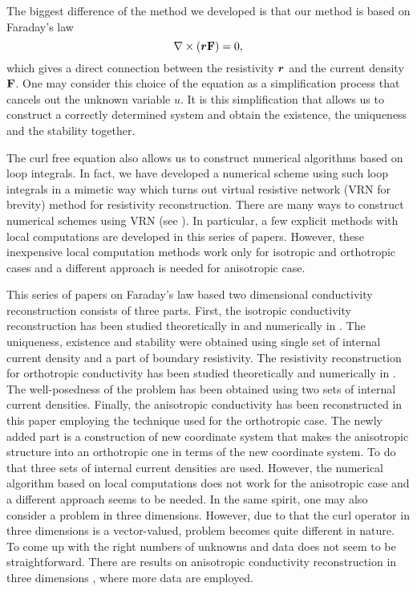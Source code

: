 \documentclass[11pt]{amsart}
\theoremstyle{plain}
\theoremstyle{remark}
\numberwithin{equation}{section}
\numberwithin{Thm}{section}
\def\F{{\bf F}}
\def\r{{\bf r}}
\def\r{\mbox{\boldmath$r$}}
\begin{document}
The biggest difference of the method we developed is that our method is based on Faraday's law
\begin{equation}\label{FaradayLaw2}
\nabla\times(\r\F)=0,
\end{equation}
which gives a direct connection between the resistivity $\r$ and the current density $\F$. One may consider this choice of the equation as a simplification process that cancels out the unknown variable $u$. It is this simplification that allows us to construct a correctly determined system and obtain the existence, the uniqueness and the stability together.

The curl free equation also allows us to construct numerical algorithms based on loop integrals. In fact, we have developed a numerical scheme using such loop integrals in a mimetic way which turns out virtual resistive network (VRN for brevity) method for resistivity reconstruction. There are many ways to construct numerical schemes using VRN (see \cite{lee_virtual_2014,lee_orthotropic_2015,lee_reconstruction_2010}). In particular, a few explicit methods with local computations are developed in this series of papers. However, these inexpensive local computation methods work only for isotropic and orthotropic cases and a different approach is needed for anisotropic case.

This series of papers on Faraday's law based two dimensional conductivity reconstruction consists of three parts. First, the isotropic conductivity reconstruction has been studied theoretically in \cite{lee_well-posedness_2015} and numerically in \cite{lee_virtual_2014}. The uniqueness, existence and stability were obtained using single set of internal current density and a part of boundary resistivity. The resistivity reconstruction for orthotropic conductivity has been studied theoretically and numerically in \cite{lee_orthotropic_2015}. The well-posedness of the problem has been obtained using two sets of internal current densities. Finally, the anisotropic conductivity has been reconstructed in this paper employing the technique used for the orthotropic case. The newly added part is a construction of new coordinate system that makes the anisotropic structure into an orthotropic one in terms of the new coordinate system. To do that three sets of internal current densities are used. However, the numerical algorithm based on local computations does not work for the anisotropic case and a different approach seems to be needed. In the same spirit, one may also consider a problem in three dimensions. However, due to that the curl operator in three dimensions is a vector-valued, problem becomes quite different in nature. To come up with the right numbers of unknowns and data does not seem to be straightforward. There are results on anisotropic conductivity reconstruction in three dimensions \cite{doi:10.1080/03605302.2013.787089, FR_2018}, where more data are employed.
\end{document}
